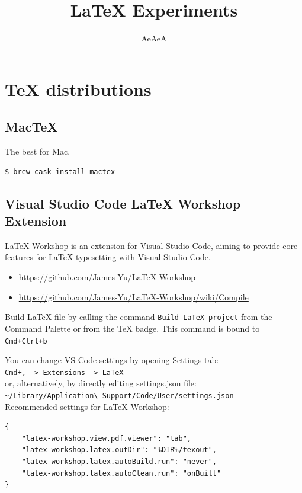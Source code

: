 \documentclass[letterpaper]{article}
\title{\LaTeX{} Experiments}
\author{AeAeA}
\begin{document}
\maketitle

\section{TeX distributions}

\subsection{MacTeX}

The best for Mac.
\begin{verbatim}$ brew cask install mactex\end{verbatim}

\subsection{Visual Studio Code LaTeX Workshop Extension}

LaTeX Workshop is an extension for Visual Studio Code, aiming 
to provide core features for LaTeX typesetting with Visual Studio Code.
\begin{itemize}
    \item \url{https://github.com/James-Yu/LaTeX-Workshop}
    \item \url{https://github.com/James-Yu/LaTeX-Workshop/wiki/Compile}
\end{itemize}
Build LaTeX file by calling the command \verb|Build LaTeX project| from the\\
Command Palette or from the TeX badge. This command is bound to \\
\verb|Cmd+Ctrl+b|

You can change VS Code settings by opening Settings tab:\\ 
\verb|Cmd+, -> Extensions -> LaTeX| \\ 
or, alternatively, by directly editing settings.json file:\\ 
\verb|~/Library/Application\ Support/Code/User/settings.json| \\
Recommended settings for LaTeX Workshop:
\begin{verbatim}
{
    "latex-workshop.view.pdf.viewer": "tab",
    "latex-workshop.latex.outDir": "%DIR%/texout",
    "latex-workshop.latex.autoBuild.run": "never",
    "latex-workshop.latex.autoClean.run": "onBuilt"
}
\end{verbatim}
\end{document}
